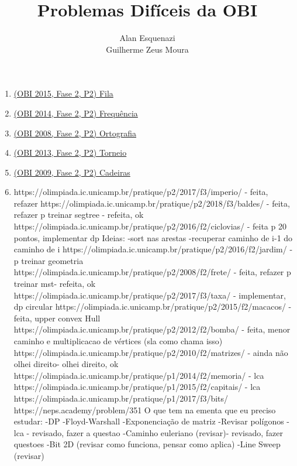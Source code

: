 \documentclass[10pt,a4paper]{article}
\title{Problemas Difíceis da OBI}
\date{}
\author{Alan Esquenazi \\ Guilherme Zeus Moura}
\begin{document}
	\maketitle

	\begin{enumerate}[label = --]
		\item \href{https://olimpiada.ic.unicamp.br/pratique/p2/2015/f2/fila/}{(OBI 2015, Fase 2, P2) Fila}
		\item \href{https://olimpiada.ic.unicamp.br/pratique/p2/2014/f2/frequencia/
}{(OBI 2014, Fase 2, P2) Frequência}
		\item \href{https://olimpiada.ic.unicamp.br/pratique/p2/2008/f2/ortografia/}{(OBI 2008, Fase 2, P2) Ortografia}
		\item \href{https://olimpiada.ic.unicamp.br/pratique/p2/2013/f2/torneio/}{(OBI 2013, Fase 2, P2) Torneio}
		\item \href{https://olimpiada.ic.unicamp.br/pratique/p2/2009/f2/cadeiras/}{(OBI 2009, Fase 2, P2) Cadeiras}
		\item 
https://olimpiada.ic.unicamp.br/pratique/p2/2017/f3/imperio/ - feita, refazer
https://olimpiada.ic.unicamp.br/pratique/p2/2018/f3/baldes/ - feita, refazer p treinar segtree - refeita, ok
https://olimpiada.ic.unicamp.br/pratique/p2/2016/f2/ciclovias/ - feita p 20 pontos, implementar dp
Ideias:
-sort nas arestas
-recuperar caminho de i-1 do caminho de i
https://olimpiada.ic.unicamp.br/pratique/p2/2016/f2/jardim/ - p treinar geometria
https://olimpiada.ic.unicamp.br/pratique/p2/2008/f2/frete/ - feita, refazer p treinar mst- refeita, ok
https://olimpiada.ic.unicamp.br/pratique/p2/2017/f3/taxa/ - implementar, dp circular
https://olimpiada.ic.unicamp.br/pratique/p2/2015/f2/macacos/ - feita, upper convex Hull
https://olimpiada.ic.unicamp.br/pratique/p2/2012/f2/bomba/ - feita, menor caminho e multiplicacao de vértices (sla como chama isso)
https://olimpiada.ic.unicamp.br/pratique/p2/2010/f2/matrizes/ - ainda não olhei direito- olhei direito, ok
https://olimpiada.ic.unicamp.br/pratique/p1/2014/f2/memoria/ - lca
https://olimpiada.ic.unicamp.br/pratique/p1/2015/f2/capitais/ - lca
https://olimpiada.ic.unicamp.br/pratique/p1/2017/f3/bits/
https://neps.academy/problem/351
O que tem na ementa que eu preciso estudar:
-DP
-Floyd-Warshall
-Exponenciação de matriz
-Revisar polígonos
-lca - revisado, fazer a questao
-Caminho euleriano (revisar)- revisado, fazer questoes
-Bit 2D (revisar como funciona, pensar como aplica)
-Line Sweep (revisar)

 
	\end{enumerate}
\end{document}
